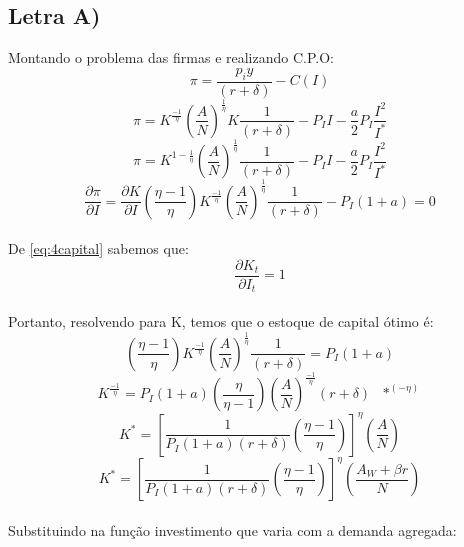 \documentclass{article}
\begin{document}
\subsection*{Letra A)}
Montando o problema das firmas e realizando C.P.O:
\begin{equation}
    \pi = \frac{p_i y}{(r+\delta)} - C(I)
\end{equation}
\begin{equation}
    \pi = K^{\frac{-1}{\eta}}\left(\frac{A}{N}\right)^\frac{1}{\eta} K\frac{1}{(r+\delta)} - P_I I - \frac{a}{2}P_I \frac{I^2}{I^*}
\end{equation}
\begin{equation}
    \pi = K^{1-\frac{1}{\eta}}\left(\frac{A}{N}\right)^\frac{1}{\eta}\frac{1}{(r+\delta)} - P_I I - \frac{a}{2}P_I \frac{I^2}{I^*}
\end{equation}
\begin{equation}
    \frac{\partial \pi}{\partial I} = \frac{\partial K}{\partial I}
    \left(\frac{\eta-1}{\eta}\right)K^{\frac{-1}{\eta}}\left(\frac{A}{N}\right)^\frac{1}{\eta}\frac{1}{(r+\delta)}-P_I(1+a) = 0
\end{equation}
\\
De \eqref{eq:4capital} sabemos que:
\begin{equation}
    \frac{\partial K_t}{\partial I_t} = 1
\end{equation}
\\
Portanto, resolvendo para K, temos que o estoque de capital ótimo é:
\begin{equation}
    \left(\frac{\eta-1}{\eta}\right)K^{\frac{-1}{\eta}}\left(\frac{A}{N}\right)^\frac{1}{\eta}\frac{1}{(r+\delta)}=P_I(1+a)
\end{equation}
\begin{equation}
    K^{\frac{-1}{\eta}}=P_I(1+a)\left(\frac{\eta}{\eta-1}\right)\left(\frac{A}{N}\right)^\frac{-1}{\eta}(r+\delta) \>\>\> *^{(-\eta)}
\end{equation}
\begin{equation}
    K^*=\left[\frac{1}{P_I(1+a)(r+\delta)}\left(\frac{\eta-1}{\eta}\right)\right]^{\eta}\left(\frac{A}{N}\right)
\end{equation}
\begin{equation}\label{eq:14ACapitalStar}
    K^*=\left[\frac{1}{P_I(1+a)(r+\delta)}\left(\frac{\eta-1}{\eta}\right)\right]^{\eta}\left(\frac{A_W+\beta r}{N}\right)
\end{equation}
\\
Substituindo na função investimento que varia com a demanda agregada:
\end{document}
